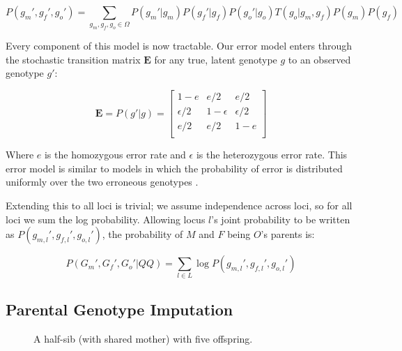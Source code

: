 \documentclass[11pt]{article}
\begin{document}
$$
P(g_m', g_f', g_o') = \sum_{g_m,g_f,g_o \in \Omega} P(g_m' | g_m) P(g_f'|g_f) P(g_o'|g_o) T(g_o | g_m, g_f) P(g_m) P(g_f)
$$

%
%
Every component of this model is now tractable. Our error model enters through
the stochastic transition matrix $\mathbf{E}$ for any true, latent genotype $g$
to an observed genotype $g'$:

$$
\mathbf{E} = P(g'|g) = \left[ \begin{array}{ccc}
1 - e & e/2 & e/2 \\
\epsilon/2 & 1 - \epsilon & \epsilon/2 \\
e/2 & e/2 & 1 - e \\
\end{array} \right]
$$

Where $e$ is the homozygous error rate and $\epsilon$ is the heterozygous error
rate. This error model is similar to models in which the probability of error
is distributed uniformly over the two erroneous genotypes
\citep*{sobel2002detection,lincoln1992systematic}.

Extending this to all loci is trivial; we assume independence across loci, so
for all loci we sum the log probability. Allowing locus $l$'s joint probability
to be written as $P(g_{m,l}', g_{f,l}', g_{o,l}')$, the probability of $M$ and
$F$ being $O$'s parents is:

$$
P(G_m', G_f', G_o' | QQ) = \sum_{l \in L} \log P(g_{m,l}', g_{f,l}', g_{o,l}')
$$

%

%
%
\subsection{Parental Genotype Imputation}

\begin{figure}
\centering
\begingroup
{}%

\endgroup

\caption{A half-sib (with shared mother) with five offspring.}

\label{fig:dag}

\end{figure}
\end{document}
